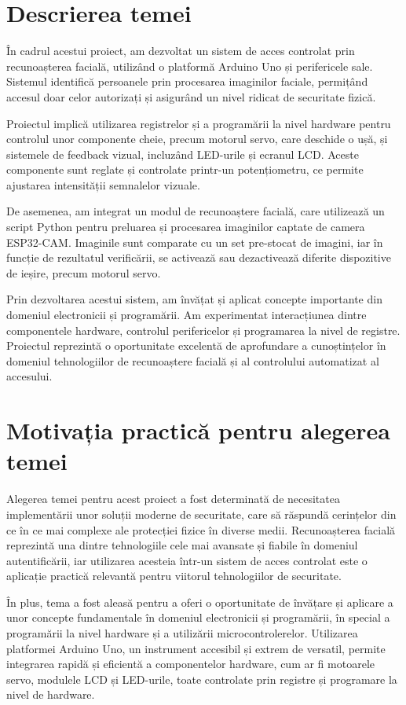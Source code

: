 \documentclass[a4paper,12pt]{report}
\begin{document}
\section{Descrierea temei}
În cadrul acestui proiect, am dezvoltat un sistem de acces controlat prin recunoașterea facială, utilizând o platformă Arduino Uno și perifericele sale. Sistemul identifică persoanele prin procesarea imaginilor faciale, permițând accesul doar celor autorizați și asigurând un nivel ridicat de securitate fizică.

Proiectul implică utilizarea registrelor și a programării la nivel hardware pentru controlul unor componente cheie, precum motorul servo, care deschide o ușă, și sistemele de feedback vizual, incluzând LED-urile și ecranul LCD. Aceste componente sunt reglate și controlate printr-un potențiometru, ce permite ajustarea intensității semnalelor vizuale.

De asemenea, am integrat un modul de recunoaștere facială, care utilizează un script Python pentru preluarea și procesarea imaginilor captate de camera ESP32-CAM. Imaginile sunt comparate cu un set pre-stocat de imagini, iar în funcție de rezultatul verificării, se activează sau dezactivează diferite dispozitive de ieșire, precum motorul servo.

Prin dezvoltarea acestui sistem, am învățat și aplicat concepte importante din domeniul electronicii și programării. Am experimentat interacțiunea dintre componentele hardware, controlul perifericelor și programarea la nivel de registre. Proiectul reprezintă o oportunitate excelentă de aprofundare a cunoștințelor în domeniul tehnologiilor de recunoaștere facială și al controlului automatizat al accesului.

\section{Motivația practică pentru alegerea temei}
Alegerea temei pentru acest proiect a fost determinată de necesitatea implementării unor soluții moderne de securitate, care să răspundă cerințelor din ce în ce mai complexe ale protecției fizice în diverse medii. Recunoașterea facială reprezintă una dintre tehnologiile cele mai avansate și fiabile în domeniul autentificării, iar utilizarea acesteia într-un sistem de acces controlat este o aplicație practică relevantă pentru viitorul tehnologiilor de securitate.

În plus, tema a fost aleasă pentru a oferi o oportunitate de învățare și aplicare a unor concepte fundamentale în domeniul electronicii și programării, în special a programării la nivel hardware și a utilizării microcontrolerelor. Utilizarea platformei Arduino Uno, un instrument accesibil și extrem de versatil, permite integrarea rapidă și eficientă a componentelor hardware, cum ar fi motoarele servo, modulele LCD și LED-urile, toate controlate prin registre și programare la nivel de hardware.
\end{document}
